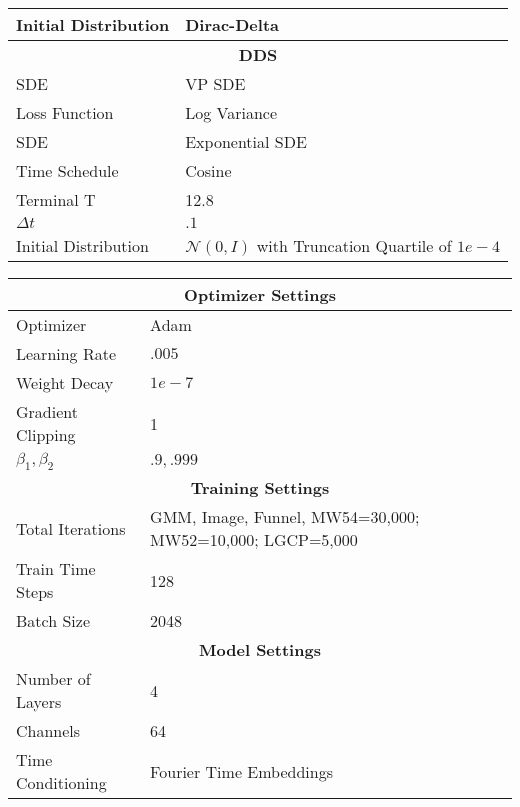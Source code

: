 \begin{table*}
\begin{minipage}[t]{.45\textwidth}
\begin{tabular}{p{4cm} p{4cm}}
            Initial Distribution & Dirac-Delta  \\  
            \midrule
            \multicolumn{2}{c}{\textbf{DDS} \citep{vargas2023dds}}  \\
            \midrule 
            SDE & VP SDE \\ 
            Loss Function & Log Variance \\ 
            SDE & Exponential SDE \\
            Time Schedule & Cosine \\ 
            Terminal T & 12.8 \\ 
            $\Delta t$ & $.1$ \\
            Initial Distribution & $\mathcal{N}(0, I)$ with Truncation Quartile of $1e-4$ \\
            \bottomrule
        \end{tabular}
        \caption{Diffusion Sampler Configurations}
        \label{tab:sampler_comparison}
    \end{minipage} \hfill
    \begin{minipage}[t]{.45\textwidth}
    \vspace{0pt} 
        \begin{tabular}{p{4cm} p{4cm}}  
            \toprule
            \multicolumn{2}{c}{\textbf{Optimizer Settings}} \\  
            \midrule
            Optimizer & Adam \\ 
            Learning Rate & $.005$ \\ 
            Weight Decay & $1e-7$ \\
            Gradient Clipping & 1 \\
            $\beta_1, \beta_2$ & $.9, .999$ \\
            \midrule 
            \multicolumn{2}{c}{\textbf{Training Settings}} \\  
            \midrule
            Total Iterations & GMM, Image, Funnel, MW54=30,000; MW52=10,000; LGCP=5,000 \\
            Train Time Steps & 128 \\ 
            Batch Size & 2048 \\
            \midrule 
            \multicolumn{2}{c}{\textbf{Model Settings}} \\
            \midrule 
            Number of Layers & 4 \\ 
            Channels & 64 \\
            Time Conditioning & Fourier Time Embeddings \citet{tancik2020fourier} \\ 

\end{tabular}
\end{minipage}
\end{table*}
